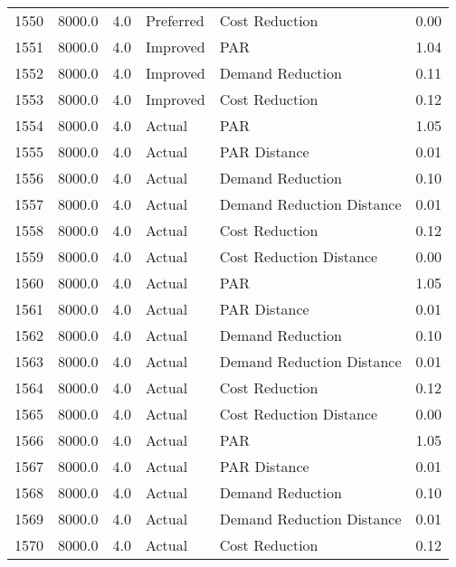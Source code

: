 \begin{longtable}{lrrllr}
1550 &       8000.0 &     4.0 &      Preferred &             Cost Reduction &   0.00 \\
1551 &       8000.0 &     4.0 &       Improved &                        PAR &   1.04 \\
1552 &       8000.0 &     4.0 &       Improved &           Demand Reduction &   0.11 \\
1553 &       8000.0 &     4.0 &       Improved &             Cost Reduction &   0.12 \\
1554 &       8000.0 &     4.0 &         Actual &                        PAR &   1.05 \\
1555 &       8000.0 &     4.0 &         Actual &               PAR Distance &   0.01 \\
1556 &       8000.0 &     4.0 &         Actual &           Demand Reduction &   0.10 \\
1557 &       8000.0 &     4.0 &         Actual &  Demand Reduction Distance &   0.01 \\
1558 &       8000.0 &     4.0 &         Actual &             Cost Reduction &   0.12 \\
1559 &       8000.0 &     4.0 &         Actual &    Cost Reduction Distance &   0.00 \\
1560 &       8000.0 &     4.0 &         Actual &                        PAR &   1.05 \\
1561 &       8000.0 &     4.0 &         Actual &               PAR Distance &   0.01 \\
1562 &       8000.0 &     4.0 &         Actual &           Demand Reduction &   0.10 \\
1563 &       8000.0 &     4.0 &         Actual &  Demand Reduction Distance &   0.01 \\
1564 &       8000.0 &     4.0 &         Actual &             Cost Reduction &   0.12 \\
1565 &       8000.0 &     4.0 &         Actual &    Cost Reduction Distance &   0.00 \\
1566 &       8000.0 &     4.0 &         Actual &                        PAR &   1.05 \\
1567 &       8000.0 &     4.0 &         Actual &               PAR Distance &   0.01 \\
1568 &       8000.0 &     4.0 &         Actual &           Demand Reduction &   0.10 \\
1569 &       8000.0 &     4.0 &         Actual &  Demand Reduction Distance &   0.01 \\
1570 &       8000.0 &     4.0 &         Actual &             Cost Reduction &   0.12 \\

\end{longtable}

